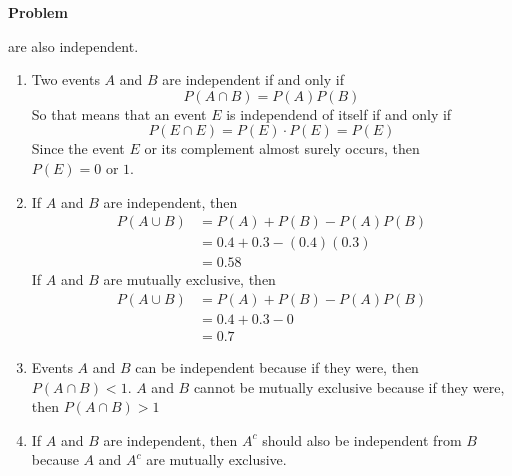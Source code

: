 \documentclass[12pt]{article}
\newenvironment{Ex}{\textbf{Problem}\vspace{.75em}\\}{}
\begin{document}
\begin{enumerate}
\begin{Ex}
\begin{enumerate}
        are also independent.
      \end{enumerate}
      \pagebreak[4]
      \begin{solution} \hfill
        \begin{enumerate}
        \item Two events $A$ and $B$ are independent if and only if
          \begin{equation}
            \label{eq:7a-declaration}
            P(A \cap B) = P(A) P(B)
          \end{equation}
          So that means that an event $E$ is independend of itself if
          and only if
          \begin{equation}
            \label{eq:7a-plug-in}
            P(E \cap E) = P(E) \cdot P(E) = P(E)
          \end{equation}
          Since the event $E$ or its complement almost surely occurs,
          then $P(E) = 0 \text{ or } 1$.
        \item If $A$ and $B$ are independent, then
          \begin{equation}
            \label{eq:7b-independent}
            \begin{aligned}
              P(A \cup B) &= P(A) + P(B) - P(A)P(B) \\
              &= 0.4 + 0.3 - (0.4)(0.3) \\
              &= 0.58
            \end{aligned}
          \end{equation}
          If $A$ and $B$ are mutually exclusive, then
          \begin{equation}
            \label{eq:7b-exclusive}
            \begin{aligned}
              P(A \cup B) &= P(A) + P(B) - P(A)P(B) \\
              &= 0.4 + 0.3 - 0 \\
              &= 0.7
            \end{aligned}
          \end{equation}
        \item Events $A$ and $B$ can be independent because if they
          were, then $P(A \cap B) < 1$. $A$ and $B$ cannot be mutually
          exclusive because if they were, then $P(A \cap B) > 1$
        \item If $A$ and $B$ are independent, then $A^c$ should also
          be independent from $B$ because $A$ and $A^c$ are mutually
          exclusive.
        \end{enumerate}

\end{solution}
\end{Ex}
\end{enumerate}
\end{document}
